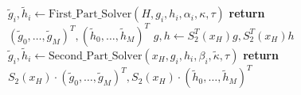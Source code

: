 \begin{algorithm}[ht]
\begin{algorithmic}[1]
        		\State $\tilde{g}_i,\tilde{h}_i\gets \text{First\_Part\_Solver}(H,g_i, h_i,\alpha_i,\kappa,\tau)$
        	\EndFor
        	\State \textbf{return} $(\tilde{g}_0,\dots,\tilde{g}_M)^T, (\tilde{h}_0,\dots,\tilde{h}_M)^T$
        \EndFunction
        	\State $g,h\gets S_2^T(x_H)g, S_2^T(x_H)h$
        		\State $\tilde{g}_i,\tilde{h}_i\gets \text{Second\_Part\_Solver}(x_H,g_i,h_i,\beta_i,\tilde{\kappa},\tau)$
        	\EndFor
        	\State \textbf{return} $S_2(x_H)\cdot (\tilde{g}_0,\dots,\tilde{g}_M)^T, S_2(x_H)\cdot (\tilde{h}_0,\dots,\tilde{h}_M)^T$
        \EndFunction
        
    \end{algorithmic}
\end{algorithm}

